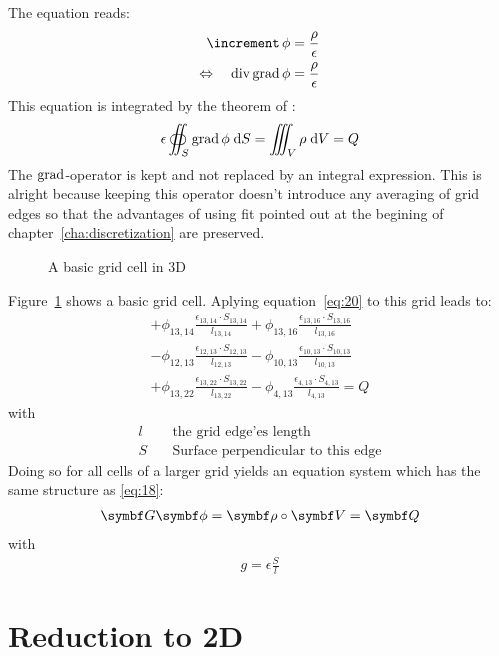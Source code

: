 The  equation reads:
\begin{align}
  \laplaceop \phi &= \frac{\rho}{\epsilon} \\
  \Leftrightarrow\quad\divop \grad \phi &= \frac{\rho}{\epsilon}
\end{align}
This equation is integrated by the theorem of :
\begin{gather}
  \epsilon\oiint_{S}\operatorname{grad} \phi\;\mathrm{d}S = \iiint_{V}\rho\;\mathrm{d}V = Q
  \label{eq:20}
\end{gather}
The $\operatorname{grad}$-operator is kept and not replaced by an integral
expression.  This is alright because keeping this operator doesn't
introduce any averaging of grid edges so that the advantages of using
\gls{fit} pointed out at the begining of
chapter~\ref{cha:discretization} are preserved.
\begin{figure}
  \centering
  
  \caption{A basic grid cell in 3D}
  \label{fig:BasicGridCellPoisson3D}
\end{figure}
Figure~\ref{fig:BasicGridCellPoisson3D} shows a basic grid cell.
Aplying equation~\eqref{eq:20} to this grid leads to:
\newcommand*{\phiepsilonSl}[2]{
  \ensuremath{\phi_{#1,#2}
  \frac{\epsilon_{#1,#2}\cdot S_{#1,#2}}{l_{#1,#2}}}}
\begin{multline}
  +\phiepsilonSl{13}{14}+\phiepsilonSl{13}{16} \\
  -\phiepsilonSl{12}{13}-\phiepsilonSl{10}{13} \\
  +\phiepsilonSl{13}{22}-\phiepsilonSl{4}{13} = Q
\end{multline}
with
\begin{align*}
  l&\quad \text{the grid edge'es length} \\
  S&\quad \text{Surface perpendicular to this edge}
\end{align*}
Doing so for all cells of a larger grid yields an equation system
which has the same structure as \eqref{eq:18}:
\begin{gather}
  \matr{G}\vect{\phi}=\vect{\rho}\circ\vect{V}=\vect{Q}
\end{gather}
with
\begin{gather}
  \label{eq:32}
  g=\epsilon\frac{S}{l}
\end{gather}

\section{Reduction to 2D}
\label{sec:reduction-2d}


